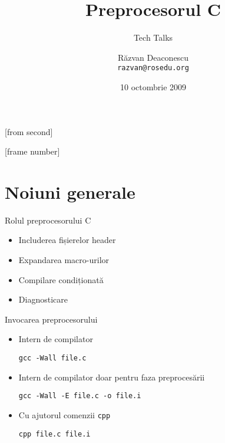 \documentclass{beamer}
\title[Preprocesorul C]{Preprocesorul C}
\subtitle{Tech Talks}
\institute{ROSEdu}
\author[Răzvan]{Răzvan Deaconescu \\ \texttt{razvan@rosedu.org}}
\date{10 octombrie 2009}
\begin{document}
[from second]

[frame number]

\frame{\titlepage}

\frame{\tableofcontents}

\section{Noiuni generale}

\frame{\tableofcontents[currentsection]}

\begin{frame}{Rolul preprocesorului C}
	\begin{itemize}		%
		\pause \item Includerea fișierelor header
		\pause \item Expandarea macro-urilor
		\pause \item Compilare condiționată
		\pause \item Diagnosticare
	\end{itemize}
\end{frame}

\begin{frame}{Invocarea preprocesorului}
	\begin{itemize}
		\pause \item Intern de compilator
			\begin{beamerboxesrounded}[lower=block body,shadow=true]{}
				\large{\texttt{gcc -Wall file.c}}
			\end{beamerboxesrounded}
		\pause \item Intern de compilator doar pentru faza preprocesării
			\begin{beamerboxesrounded}[lower=block body,shadow=true]{}
				\large{\texttt{gcc -Wall -E file.c -o file.i}}
			\end{beamerboxesrounded}
		\pause \item Cu ajutorul comenzii \texttt{cpp}
			\begin{beamerboxesrounded}[lower=block body,shadow=true]{}
				\large{\texttt{cpp file.c file.i}}
			\end{beamerboxesrounded}
	\end{itemize}
\end{frame}
\end{document}
